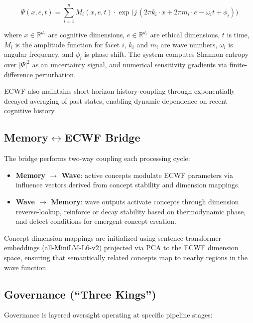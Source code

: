 \documentclass[11pt,a4paper]{article}
\begin{document}
\begin{equation}
    \Psi(x, e, t) = \sum_{i=1}^{n} M_i(x, e, t) \cdot 
    \exp\!\bigl(j\,(2\pi k_i \cdot x + 2\pi m_i \cdot e - \omega_i t + \phi_i)\bigr)
    \label{eq:ecwf}
\end{equation}

\noindent where $x \in \mathbb{R}^{d_c}$ are cognitive dimensions, 
$e \in \mathbb{R}^{d_e}$ are ethical dimensions, $t$ is time, $M_i$ is the 
amplitude function for facet $i$, $k_i$ and $m_i$ are wave numbers, 
$\omega_i$ is angular frequency, and $\phi_i$ is phase shift. The system 
computes Shannon entropy over $|\Psi|^2$ as an uncertainty signal, and 
numerical sensitivity gradients via finite-difference perturbation.

ECWF also maintains short-horizon history coupling through exponentially 
decayed averaging of past states, enabling dynamic dependence on recent 
cognitive history.

\subsection{\texorpdfstring{Memory$\leftrightarrow$ECWF Bridge}{Memory-ECWF Bridge}}

The bridge performs two-way coupling each processing cycle:

\begin{itemize}[nosep]
    \item \textbf{Memory $\to$ Wave}: active concepts modulate ECWF parameters 
          via influence vectors derived from concept stability and dimension 
          mappings.
    \item \textbf{Wave $\to$ Memory}: wave outputs activate concepts through 
          dimension reverse-lookup, reinforce or decay stability based on 
          thermodynamic phase, and detect conditions for emergent concept 
          creation.
\end{itemize}

Concept-dimension mappings are initialized using sentence-transformer 
embeddings (all-MiniLM-L6-v2) projected via PCA to the ECWF dimension 
space, ensuring that semantically related concepts map to nearby regions 
in the wave function.

\subsection{Governance (``Three Kings'')}

Governance is layered oversight operating at specific pipeline stages:
\end{document}
